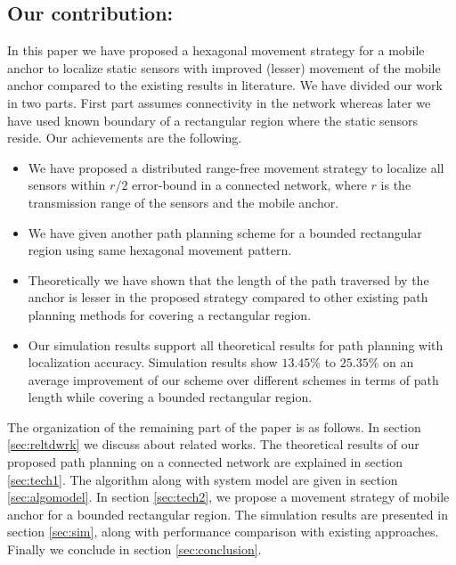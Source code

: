 \documentclass[preprint,11pt]{elsarticle}
\begin{document}
\subsection*{Our contribution:}
In this paper we have proposed a hexagonal movement strategy for a mobile anchor
to localize static sensors with improved (lesser) movement of the mobile anchor
compared to the existing results in literature. We have divided our work in two parts.
First part assumes connectivity in the network whereas later we have used known boundary
of a rectangular region where the static sensors reside. Our achievements are the following.
\begin{itemize}
\item We have proposed a distributed range-free movement strategy to localize all sensors within $r/2$ error-bound
in a connected network, where $r$ is the transmission range of the sensors and the mobile anchor.
\item We have given another path planning scheme for a bounded rectangular region
using same hexagonal movement pattern.
\item Theoretically we have shown that
the length of the path traversed by the anchor is lesser in the
proposed strategy compared to other existing path planning methods for covering
a rectangular region. \item Our simulation results support all theoretical results for path planning with localization accuracy.
Simulation results show $13.45 \%$ to $25.35 \%$ on an average improvement of our scheme over different schemes in
terms of path length while covering a bounded rectangular region.
\end{itemize}

The organization of the remaining part of the paper is as follows. In section \ref{sec:reltdwrk} we discuss
about related works. The theoretical results of our
proposed path planning on a connected network are explained in section \ref{sec:tech1}.
The algorithm along with system model are given in section \ref{sec:algomodel}.
In section \ref{sec:tech2}, we propose a movement strategy of mobile anchor for a bounded rectangular region.
The simulation results are presented in section \ref{sec:sim}, along with performance
comparison with existing approaches. Finally we conclude in section \ref{sec:conclusion}.
\end{document}
